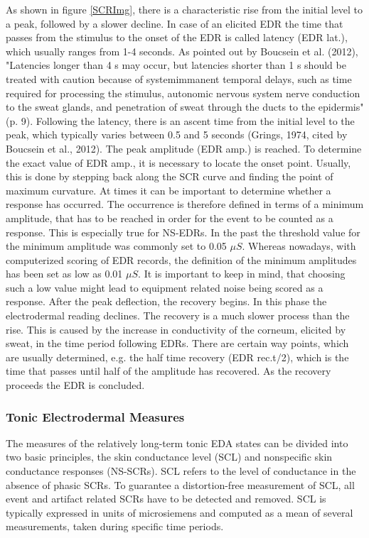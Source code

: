 As shown in figure \ref{SCRImg}, there is a characteristic rise from the initial level to a peak, followed by a slower decline. In case of an elicited EDR the time that passes from the stimulus to the onset of the EDR is called latency (EDR lat.), which usually ranges from 1-4 seconds. As pointed out by Boucsein et al. (2012), "Latencies longer than 4 s may occur, but latencies shorter than 1 s should be treated with caution because of systemimmanent temporal delays, such as time required for processing the stimulus, autonomic nervous system nerve conduction to the sweat glands, and penetration of sweat through the ducts to the epidermis"(p. 9). Following the latency, there is an ascent time from the initial level to the peak, which typically varies between 0.5 and 5 seconds (Grings, 1974, cited by Boucsein et al., 2012). The peak amplitude (EDR amp.) is reached. To determine the exact value of EDR amp., it is necessary to locate the onset point. Usually, this is done by stepping back along the SCR curve and finding the point of maximum curvature.
At times it can be important to determine whether a response has occurred. The occurrence is therefore defined in terms of a minimum amplitude, that has to be reached in order for the event to be counted as a response. This is especially true for NS-EDRs. In the past the threshold value for the minimum amplitude was commonly set to 0.05 $\mu S$. Whereas nowadays, with computerized scoring of EDR records, the definition of the minimum amplitudes has been set as low as 0.01 $\mu S$. It is important to keep in mind, that choosing such a low value might lead to equipment related noise being scored as a response. After the peak deflection, the recovery begins. In this phase the electrodermal reading declines. The recovery is a much slower process than the rise. This is caused by the increase in conductivity of the corneum, elicited by sweat, in the time period following EDRs. There are certain way points, which are usually determined, e.g. the half time recovery (EDR rec.t/2), which is the time that passes until half of the amplitude has recovered. As the recovery proceeds the EDR is concluded.

\subsubsection*{Tonic Electrodermal Measures}
The measures of the relatively long-term tonic EDA states can be divided into two basic principles, the skin conductance level (SCL) and nonspecific skin conductance responses (NS-SCRs). SCL refers to the level of conductance in the absence of phasic SCRs. To guarantee a distortion-free measurement of SCL, all event and artifact related SCRs have to be detected and removed. SCL is typically expressed in units of microsiemens and computed as a mean of several measurements, taken during specific time periods.


